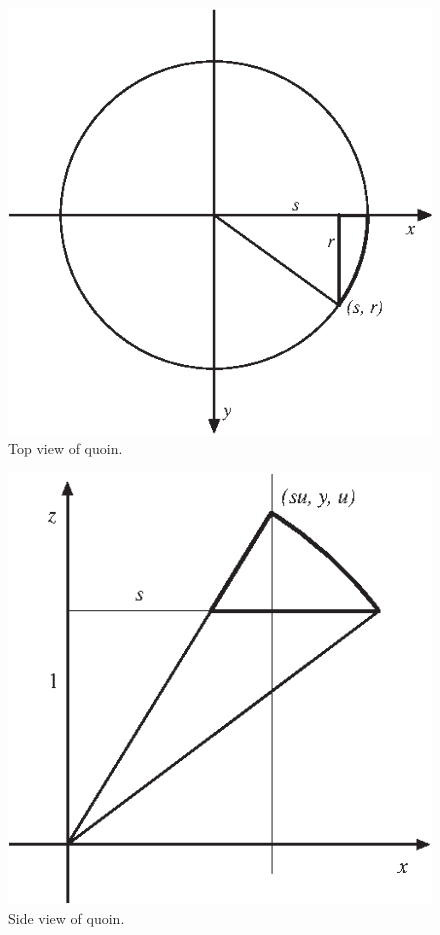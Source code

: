 \begin{figure}
\begin{center}
\includegraphics{PS/quoin1}
\end{center}
\caption{Top view of quoin.}
\label{fig:quoin1}
\end{figure}

\begin{figure}
\begin{center}
\includegraphics{PS/quoin2}
\end{center}
\caption{Side view of quoin.}
\label{fig:quoin2}
\end{figure}

